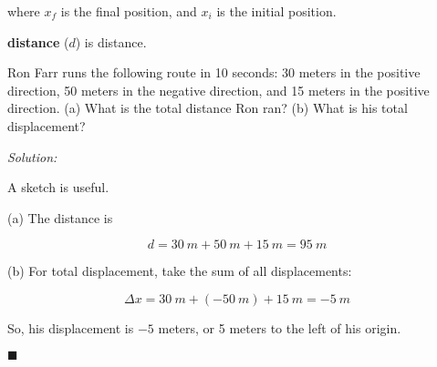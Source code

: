 \documentclass[dvipsnames]{article}
\begin{document}
where $x_f$ is the final position, and $x_i$ is the initial position.


\textbf{\Gls{distance}} ($d$) is \glsdesc{distance}.

\begin{example} \label{example-ron-farr}
    Ron Farr runs the following route in 10 seconds: 30 meters in the positive direction, 50 meters in the negative direction, and 15 meters in the positive direction. (a) What is the total distance Ron ran? (b) What is his total displacement?
\end{example}

\textit{Solution:}

A sketch is useful.

\begin{center}
\end{center}

(a) The distance is

\begin{equation*}
    d = \SI{30}{m} + \SI{50}{m} + \SI{15}{m} = \boxed{\SI{95}{m}}
\end{equation*}

(b) For total displacement, take the sum of all displacements:

\begin{equation*}
    \Delta x = \SI{30}{m} + (-\SI{50}{m}) + \SI{15}{m} = \boxed{\SI{-5}{m}}
\end{equation*}

So, his displacement is $-5$ meters, or 5 meters to the left of his origin.

\hfill $\blacksquare$
\end{document}
